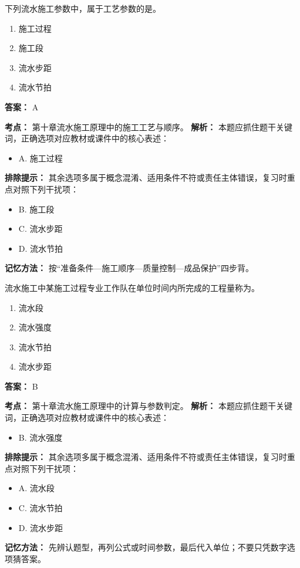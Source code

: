 \documentclass[UTF8,fontset=fandol,11pt]{ctexart}
\begin{document}
\begin{quizbox}[title={第 3 题}]
下列流水施工参数中，属于工艺参数的是。\\
\begin{enumerate}[label=\Alph*.]
\item 施工过程
\item 施工段
\item 流水步距
\item 流水节拍
\end{enumerate}
\textbf{答案：} A
\vspace{0.25em}
\begin{answerbox}[title={考点解析}]
\textbf{考点：} 第十章流水施工原理中的施工工艺与顺序。
\textbf{解析：} 本题应抓住题干关键词，正确选项对应教材或课件中的核心表述：
\begin{itemize}
\item A. 施工过程
\end{itemize}
\textbf{排除提示：} 其余选项多属于概念混淆、适用条件不符或责任主体错误，复习时重点对照下列干扰项：
\begin{itemize}
\item B. 施工段
\item C. 流水步距
\item D. 流水节拍
\end{itemize}
\textbf{记忆方法：} 按“准备条件—施工顺序—质量控制—成品保护”四步背。
\end{answerbox}
\end{quizbox}

\begin{quizbox}[title={第 4 题}]
流水施工中某施工过程专业工作队在单位时间内所完成的工程量称为。\\
\begin{enumerate}[label=\Alph*.]
\item 流水段
\item 流水强度
\item 流水节拍
\item 流水步距
\end{enumerate}
\textbf{答案：} B
\vspace{0.25em}
\begin{answerbox}[title={考点解析}]
\textbf{考点：} 第十章流水施工原理中的计算与参数判定。
\textbf{解析：} 本题应抓住题干关键词，正确选项对应教材或课件中的核心表述：
\begin{itemize}
\item B. 流水强度
\end{itemize}
\textbf{排除提示：} 其余选项多属于概念混淆、适用条件不符或责任主体错误，复习时重点对照下列干扰项：
\begin{itemize}
\item A. 流水段
\item C. 流水节拍
\item D. 流水步距
\end{itemize}
\textbf{记忆方法：} 先辨认题型，再列公式或时间参数，最后代入单位；不要只凭数字选项猜答案。
\end{answerbox}
\end{quizbox}
\end{document}
